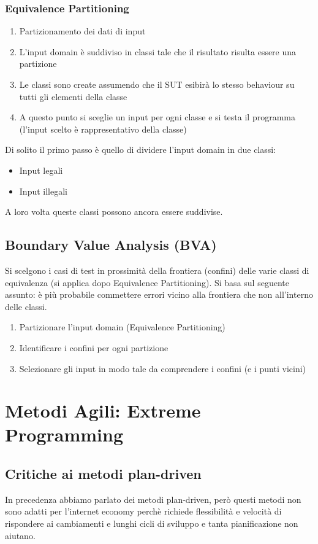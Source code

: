 \documentclass[12pt, a4paper]{report}
\begin{document}
\subsection{Equivalence Partitioning}
\begin{enumerate}
    \item Partizionamento dei dati di input
    \item L'input domain è suddiviso in classi tale che il risultato risulta essere una partizione
    \item Le classi sono create assumendo che il SUT esibirà lo stesso behaviour su tutti gli elementi della classe
    \item A questo punto si sceglie un input per ogni classe e si testa il programma (l'input scelto è rappresentativo della classe)
\end{enumerate}
Di solito il primo passo è quello di dividere l'input domain in due classi:
\begin{itemize}
    \item Input legali
    \item Input illegali
\end{itemize}
A loro volta queste classi possono ancora essere suddivise.
\section{Boundary Value Analysis (BVA)}
Si scelgono i casi di test in prossimità della frontiera (confini) delle varie classi di equivalenza (si applica dopo Equivalence Partitioning). Si basa sul seguente assunto: è più probabile commettere errori vicino alla frontiera che non all'interno delle classi.
\begin{enumerate}
    \item Partizionare l'input domain (Equivalence Partitioning)
    \item Identificare i confini per ogni partizione
    \item Selezionare gli input in modo tale da comprendere i confini (e i punti vicini)
\end{enumerate}
\chapter{Metodi Agili: Extreme Programming}
\section{Critiche ai metodi plan-driven}
In precedenza abbiamo parlato dei metodi plan-driven, però questi metodi non sono adatti per l'internet economy perchè richiede flessibilità e velocità di rispondere ai cambiamenti e lunghi cicli di sviluppo e tanta pianificazione non aiutano.
\end{document}
